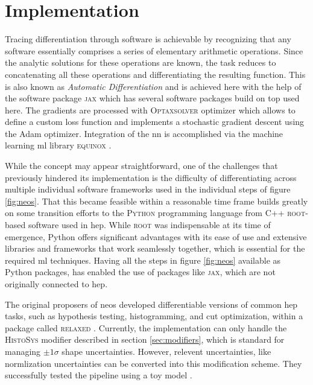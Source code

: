 \section{Implementation}
Tracing differentiation through software is achievable by recognizing that any software essentially comprises a series of elementary arithmetic operations. Since the analytic solutions for these operations are known, the task reduces to concatenating all these operations and differentiating the resulting function. This is also known as \textit{Automatic Differentiation} and is achieved here with the help of the software package \textsc{jax} \citep{jax2018github} which has several software packages build on top used here. The gradients are processed with \textsc{Optaxsolver} optimizer \citep{jaxopt_implicit_diff} which allows to define a custom loss function and implements a stochastic gradient descent using the Adam optimizer. Integration of the \ac{nn} is accomplished via the machine learning \ac{ml} library \textsc{equinox} \citep{kidger2021equinox}.

While the concept may appear straightforward, one of the challenges that previously hindered its implementation is the difficulty of differentiating across multiple individual software frameworks used in the individual steps of figure \ref{fig:neos}. That this became feasible within a reasonable time frame builds greatly on some transition efforts to the \textsc{Python} programming language from C++ \textsc{root}-based software \citep{ANTCHEVA20092499} used in \ac{hep}. While \textsc{root} was indispensable at its time of emergence, Python offers significant advantages with its ease of use and extensive libraries and frameworks that work seamlessly together, which is essential for the required \ac{ml} techniques. Having all the steps in figure \ref{fig:neos} available as Python packages, has enabled the use of packages like \textsc{jax}, which are not originally connected to \ac{hep}.

The original proposers \citet{Simpson_2023} of \ac{neos} developed differentiable versions of common \ac{hep} tasks, such as hypothesis testing, histogramming, and cut optimization, within a package called \textsc{relaxed} \citep{Simpson_relaxed_version_0_3_0_2023}. Currently, the implementation can only handle the \textsc{HistoSys} modifier described in section \ref{sec:modifiers}, which is standard for managing $\pm1\sigma$ shape uncertainties. However, relevent uncertainties, like normlization uncertainties can be converted into this modification scheme. They successfully tested the pipeline using a toy model \citep{Simpson_neos_version_0_2_0_2021}.

